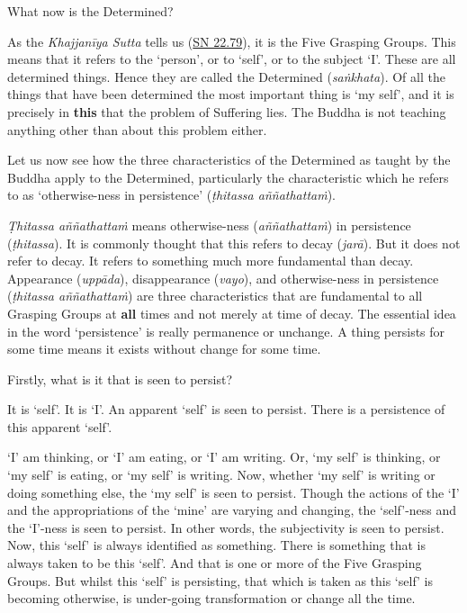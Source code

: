 What now is the Determined?

As the \emph{Khajjanīya Sutta} tells us (\href{https://suttacentral.net/sn22.79/en/bodhi}{SN 22.79}), it is the Five Grasping Groups. This means that it refers to the `person', or to `self', or to the subject `I'. These are all determined things. Hence they are called the Determined (\emph{saṅkhata}). Of all the things that have been determined the most important thing is `my self', and it is precisely in \textbf{this} that the problem of Suffering lies. The Buddha is not teaching anything other than about this problem either.

Let us now see how the three characteristics of the Determined as taught by the Buddha apply to the Determined, particularly the characteristic which he refers to as `otherwise-ness in persistence' (\emph{ṭhitassa aññathattaṁ}).

\emph{Ṭhitassa aññathattaṁ} means otherwise-ness (\emph{aññathattaṁ}) in persistence (\emph{ṭhitassa}). It is commonly thought that this refers to decay (\emph{jarā}). But it does not refer to decay. It refers to something much more fundamental than decay. Appearance (\emph{uppāda}), disappearance (\emph{vayo}), and otherwise-ness in persistence (\emph{ṭhitassa aññathattaṁ}) are three characteristics that are fundamental to all Grasping Groups at \textbf{all} times and not merely at time of decay. The essential idea in the word `persistence' is really permanence or unchange. A thing persists for some time means it exists without change for some time.

Firstly, what is it that is seen to persist?

It is `self'. It is `I'. An apparent `self' is seen to persist. There is a persistence of this apparent `self'.

`I' am thinking, or `I' am eating, or `I' am writing. Or, `my self' is thinking, or `my self' is eating, or `my self' is writing. Now, whether `my self' is writing or doing something else, the `my self' is seen to persist. Though the actions of the `I' and the appropriations of the `mine' are varying and changing, the `self'-ness and the `I'-ness is seen to persist. In other words, the subjectivity is seen to persist. Now, this `self' is always identified as something. There is something that is always taken to be this `self'. And that is one or more of the Five Grasping Groups. But whilst this `self' is persisting, that which is taken as this `self' is becoming otherwise, is under-going transformation or change all the time.

